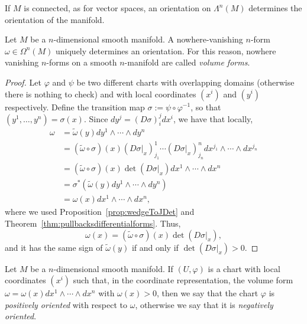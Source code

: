 If $M$ is connected, as for vector spaces, an orientation on $\Lambda^n(M)$ determines the orientation of the manifold.

\begin{theorem}
  Let $M$ be a $n$-dimensional smooth manifold.
  A nowhere-vanishing $n$-form $\omega\in\Omega^n(M)$ uniquely determines an orientation.
  For this reason, nowhere vanishing $n$-forms on a smooth $n$-manifold are called \emph{volume forms}.
\end{theorem}
\begin{proof}
  Let $\varphi$ and $\psi$ be two different charts with overlapping domains (otherwise there is nothing to check) and with local coordinates $(x^i)$ and $(y^i)$ respectively.
  Define the transition map $\sigma := \psi\circ\varphi^{-1}$, so that $(y^1,\ldots,y^n) = \sigma(x)$.
  Since $d y^j = (D\sigma)_i^j dx^i$, we have that locally,
  \begin{align}
    \omega &= \widetilde \omega(y) dy^1\wedge\cdots\wedge dy^n \\
    &= (\widetilde\omega \circ \sigma)(x) (D\sigma|_x)^1_{j_1}\cdots (D\sigma|_x)^n_{j_n} dx^{j_1}\wedge\cdots\wedge dx^{j_n} \\
    &= (\widetilde\omega \circ \sigma)(x) \det(D\sigma|_x) dx^{1}\wedge\cdots\wedge dx^{n} \\
    &= \sigma^*(\widetilde \omega(y) dy^1\wedge\cdots\wedge dy^n) \\
    &= \omega(x) dx^{1}\wedge\cdots\wedge dx^{n},
  \end{align}
  where we used Proposition~\ref{prop:wedgeToJDet} and 
  Theorem~\ref{thm:pullbacksdifferentialforms}.
  Thus,
  \begin{equation}\label{form:cov}
    \omega(x) = (\widetilde\omega \circ \sigma)(x) \det(D\sigma|_x),
  \end{equation}
  and it has the same sign of $\widetilde\omega(y)$ if and only if $\det(D\sigma|_x) > 0$.
\end{proof}

\begin{definition}
  Let $M$ be a $n$-dimensional smooth manifold.
  If $(U,\varphi)$ is a chart with local coordinates $(x^i)$ such that, in the coordinate representation, the volume form $\omega = \omega(x) dx^1\wedge\cdots\wedge dx^n$ with $\omega(x) > 0$, then we say that the chart $\varphi$ is \emph{positively oriented} with respect to $\omega$, otherwise we say that it is \emph{negatively oriented}.  
\end{definition}

